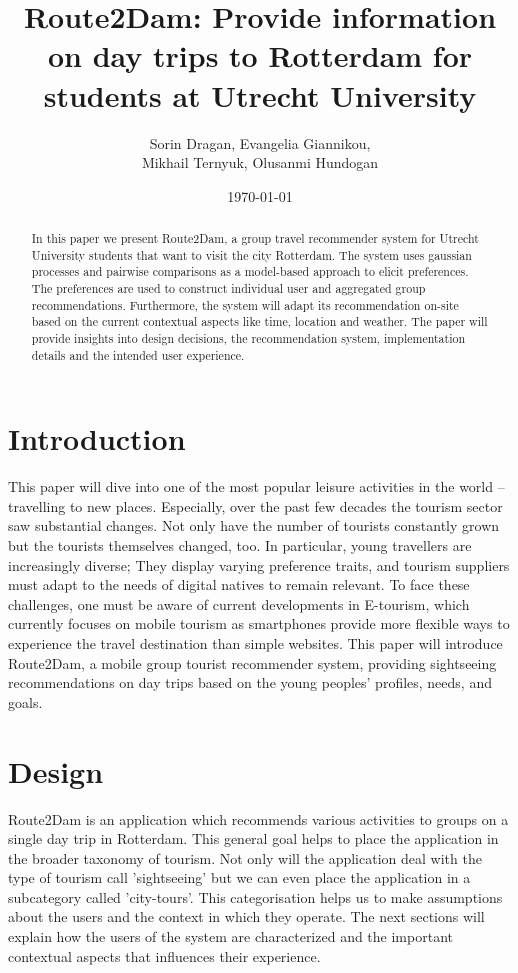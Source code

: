 \documentclass[11pt,a4paper,oneside]{article}
\title{\textbf{Route2Dam: Provide information on day trips to Rotterdam for students at Utrecht University}\newline \newline \newline}
\date{\today}
\author{Sorin Dragan, Evangelia Giannikou, \\Mikhail Ternyuk, Olusanmi Hundogan}
\begin{document}
\maketitle

\begin{abstract}
    In this paper we present Route2Dam, a group travel recommender system for Utrecht University students that want to visit the city Rotterdam. The system uses gaussian processes and pairwise comparisons as a model-based approach to elicit preferences. 
    The preferences are used to construct individual user and aggregated group recommendations. Furthermore, the system will adapt its recommendation on-site based on the current contextual aspects like time, location and weather. The paper will provide insights into design decisions, the recommendation system, implementation details and the intended user experience. 
\end{abstract}

\section{Introduction}
This paper will dive into one of the most popular leisure activities in the world -- travelling to new places.
Especially, over the past few decades the tourism sector saw substantial changes.\cite{smeral_StructuralViewTourism_2003}\cite{doi:10.18111/wtobarometereng.2020.18.1.1} Not only have the number of tourists constantly grown but the tourists themselves changed, too.\cite{OECD2020}
In particular, young travellers are increasingly diverse; They display varying preference traits, and tourism suppliers must adapt to the needs of digital natives to remain relevant.\cite{europeantravelcommission_StudyGenerationTravellers_2020}  To face these challenges, one must be aware of current developments in E-tourism, which currently focuses on mobile tourism as smartphones provide more flexible ways to experience the travel destination than simple websites.\cite{mobile_recommendation_systems} This paper will introduce Route2Dam, a mobile group tourist recommender system, providing sightseeing recommendations on day trips based on the young peoples' profiles, needs, and goals. 

\section{Design}
\label{sec:design}
Route2Dam is an application which recommends various activities to groups on a single day trip in Rotterdam. This general goal helps to place the application in the broader taxonomy of tourism. Not only will the application deal with the type of tourism \citeauthor{dunnross_SightseeingTouristsMotivation_1991} call 'sightseeing' but we can even place the application in a subcategory called 'city-tours'. This categorisation helps us to make assumptions about the users and the context in which they operate. The next sections will explain how the users of the system are characterized and the important contextual aspects that influences their experience. 
\end{document}
